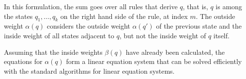 In this formulation, the sum goes over all rules that derive $q$, that is, $q$
is among the states $q_1,\ldots,q_k$ on the right hand side of the rule, at
index $m$. The outside weight $\alpha(q)$ considers the outside weight
$\alpha(q')$ of the previous state and the inside weight of all states adjacent
to $q$, but not the inside weight of $q$ itself.

Assuming that the inside weights $\beta(q)$ have already been calculated, the
equations for $\alpha(q)$ form a linear equation system that can be solved
efficiently with the standard algorithms for linear equation systems.
